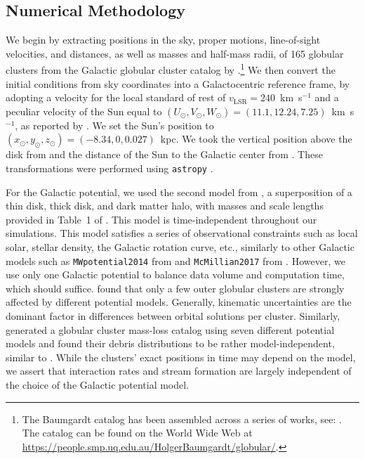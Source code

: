 \documentclass{aa}
\begin{document}
  \subsection{Numerical Methodology}\label{numerical_meth}
    We begin by extracting positions in the sky, proper motions, line-of-sight velocities, and distances, as well as masses and half-mass radii, of 165 globular clusters from the Galactic globular cluster catalog by \cite{2021MNRAS.505.5957B}.\footnote{The Baumgardt catalog has been assembled across a series of works, see: \cite{2020PASA...37...46B,2019MNRAS.482.5138B,2018MNRAS.478.1520B}. The catalog can be found on the World Wide Web at \href{https://people.smp.uq.edu.au/HolgerBaumgardt/globular/}{https://people.smp.uq.edu.au/HolgerBaumgardt/globular/}.} We then convert the initial conditions from sky coordinates into a Galactocentric reference frame, by adopting a velocity for the local standard of rest of $v_{\text{LSR}} = 240$~km~s$^{-1}$ and a peculiar velocity of the Sun equal to $(U_\odot, V_\odot, W_\odot)=(11.1, 12.24, 7.25)$~km~s$^{-1}$, as reported by \citet{2012MNRAS.427..274S}.  We set the Sun's position to $(x_\odot,y_\odot,z_\odot) = (-8.34,0,0.027)$~kpc. We took the vertical position above the disk from \citet{2001ApJ...553..184C} and the distance of the Sun to the Galactic center from \citet{2014ApJ...783..130R}. These transformations were performed using \texttt{astropy} \citep{2013A&A...558A..33A}.

    For the Galactic potential, we used the second model from \citet{2017A&A...598A..66P}, a superposition of a thin disk, thick disk, and dark matter halo, with masses and scale lengths provided in Table~1 of \citet{2023A&A...673A..44F}. This model is time-independent throughout our simulations. This model satisfies a series of observational constraints such as local solar, stellar density, the Galactic rotation curve, etc., similarly to other Galactic models such as \texttt{MWpotential2014} from \citet{2015ApJS..216...29B} and \texttt{McMillian2017} from \citet{2017MNRAS.465...76M}. However, we use only one Galactic potential to balance data volume and computation time, which should suffice. \citet{2021MNRAS.505.5978V} found that only a few outer globular clusters are strongly affected by different potential models. Generally, kinematic uncertainties are the dominant factor in differences between orbital solutions per cluster. Similarly, \citet{2024MNRAS.528.5189G} generated a globular cluster mass-loss catalog using seven different potential models and found their debris distributions to be rather model-independent, similar to \citet{2023A&A...673A..44F}. While the clusters' exact positions in time may depend on the model, we assert that interaction rates and stream formation are largely independent of the choice of the Galactic potential model.
    
\end{document}
